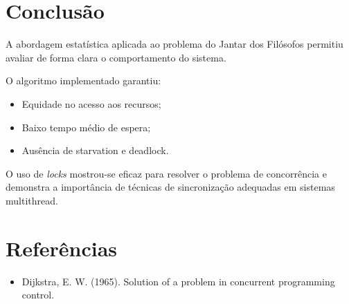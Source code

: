 \documentclass[12pt,a4paper]{article}
\begin{document}
\section{Conclusão}
A abordagem estatística aplicada ao problema do Jantar dos Filósofos permitiu avaliar de forma clara o comportamento do sistema.  

O algoritmo implementado garantiu:

\begin{itemize}
    \item Equidade no acesso aos recursos;
    \item Baixo tempo médio de espera;
    \item Ausência de starvation e deadlock.
\end{itemize}

O uso de \textit{locks} mostrou-se eficaz para resolver o problema de concorrência e demonstra a importância de técnicas de sincronização adequadas em sistemas multithread.

\section*{Referências}
\begin{itemize}
    \item Dijkstra, E. W. (1965). Solution of a problem in concurrent programming control.
\end{itemize}
\end{document}
